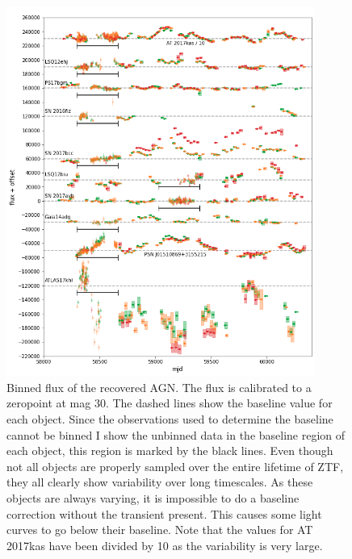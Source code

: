 \documentclass[a4paper,oneside,12pt, class=Latex/Classes/PhDthesisPSnPDF, crop=false]{standalone}
\begin{document}
\begin{figure}
    \centering
    \includegraphics[width=0.9\textwidth]{../Images/chapter_4/non-transients_AGN.png}
    \caption{Binned flux of the recovered AGN. The flux is calibrated to a zeropoint at mag 30. The dashed lines show the baseline value for each object. Since the observations used to determine the baseline cannot be binned I show the unbinned data in the baseline region of each object, this region is marked by the black lines. Even though not all objects are properly sampled over the entire lifetime of ZTF, they all clearly show variability over long timescales. As these objects are always varying, it is impossible to do a baseline correction without the transient present. This causes some light curves to go below their baseline. Note that the values for AT 2017kas have been divided by 10 as the variability is very large.}
    \label{non-transients_AGN}
\end{figure}
\end{document}
